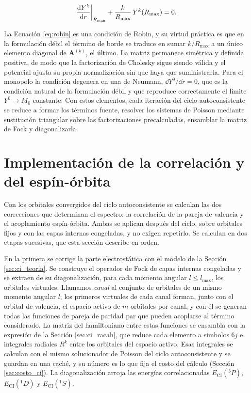 \begin{equation}
\label{eq:robin}
  \left. \dv{Y^k}{r} \right|_{R_{\text{max}}} + \frac{k}{R_{\text{max}}}\, Y^k(R_{\text{max}}) = 0 .
\end{equation}

La Ecuación \eqref{eq:robin} es una condición de Robin, y su virtud práctica es que en la formulación débil el término de borde se traduce en sumar $k/R_{\text{max}}$ a un único elemento diagonal de $\bm{A}^{(k)}$, el último. La matriz permanece simétrica y definida positiva, de modo que la factorización de Cholesky sigue siendo válida y el potencial ajusta su propia normalización sin que haya que suministrarla. Para el monopolo la condición degenera en una de Neumann, $\dd Y^0/\dd r = 0$, que es la condición natural de la formulación débil y que reproduce correctamente el límite $Y^0 \to M_0$ constante. Con estos elementos, cada iteración del ciclo autoconsistente se reduce a formar los términos fuente, resolver los sistemas de Poisson mediante sustitución triangular sobre las factorizaciones precalculadas, ensamblar la matriz de Fock y diagonalizarla.

\section{Implementación de la correlación y del espín-órbita}
\label{sec:ci_method}

Con los orbitales convergidos del ciclo autoconsistente se calculan las dos correcciones que determinan el espectro: la correlación de la pareja de valencia y el acoplamiento espín-órbita. Ambas se aplican después del ciclo, sobre orbitales fijos y con las capas internas congeladas, y no exigen repetirlo. Se calculan en dos etapas sucesivas, que esta sección describe en orden.

En la primera se corrige la parte electrostática con el modelo de la Sección \ref{sec:ci_teoria}. Se construye el operador de Fock de capas internas congeladas y se extraen de su diagonalización, para cada momento angular $l \le l_{\max}$, los orbitales virtuales. Llamamos \textit{canal} al conjunto de orbitales de un mismo momento angular $l$; los primeros virtuales de cada canal forman, junto con el orbital de valencia, el espacio activo de $m$ orbitales por canal, y con él se generan todas las funciones de pareja de paridad par que pueden acoplarse al término considerado. La matriz del hamiltoniano entre estas funciones se ensambla con la expresión de la Sección \ref{sec:ci_racah}, que reduce cada elemento a símbolos $6j$ e integrales radiales $R^k$ entre los orbitales del espacio activo. Esas integrales se calculan con el mismo solucionador de Poisson del ciclo autoconsistente y se guardan en una caché, y su número es lo que fija el costo del cálculo (Sección \ref{sec:costo_ci}). La diagonalización arroja las energías correlacionadas $E_{\text{CI}}(^3P)$, $E_{\text{CI}}(^1D)$ y $E_{\text{CI}}(^1S)$.

